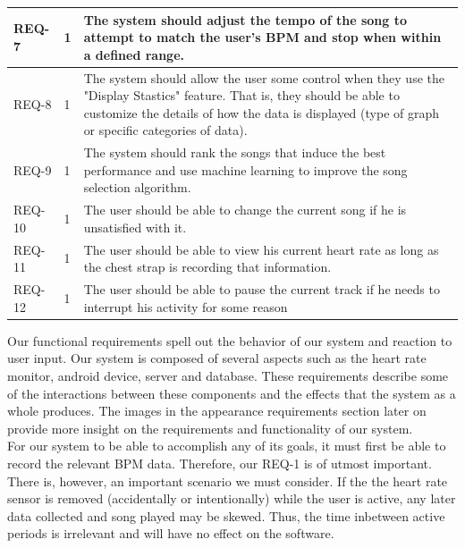 \documentclass[letterpaper,english, 12pt]{scrreprt}
\begin{document}
\begin{center}
	\begin{tabular}{|C{2cm}|C{2cm}|C{8cm}|}
		\hline
			REQ-7 & 1 & The system should adjust the tempo of the song to attempt to match the user's BPM and stop when within a defined range. \\
		\hline
			REQ-8 & 1 & The system should allow the user some control when they use the "Display Stastics" feature. That is, they should be able to customize the details of how the data is displayed (type of graph or specific categories of data).\\
		\hline
			REQ-9 & 1 & The system should rank the songs that induce the best performance and use machine learning to improve the song selection algorithm. \\
		\hline
                        REQ-10 & 1 & The user should be able to change the current song if he is unsatisfied with it. \\
                \hline
                        REQ-11 & 1 & The user should be able to view his current heart rate as long as the chest strap is recording that information. \\
		\hline
			REQ-12 & 1 & The user should be able to pause the current track if he needs to interrupt his activity for some reason \\
		\hline
	\end{tabular}
\end{center}

Our functional requirements spell out the behavior of our system and reaction to
user input. Our system is composed of several aspects such as the heart rate
monitor, android device, server and database. These requirements
describe some of the interactions between these components and the effects that
the system as a whole produces. The images in the appearance requirements section
later on provide more insight on the requirements and functionality of our system. \\

For our system to be able to accomplish any of its goals, it must first be able to record the relevant BPM data. Therefore, our REQ-1 is of utmost important. There is, however, an important scenario we must consider. If the the heart rate sensor is removed (accidentally or intentionally) while the user is active, any later data collected and song played may be skewed. Thus, the time inbetween active periods is irrelevant and will have no effect on the software.\\
\end{document}
